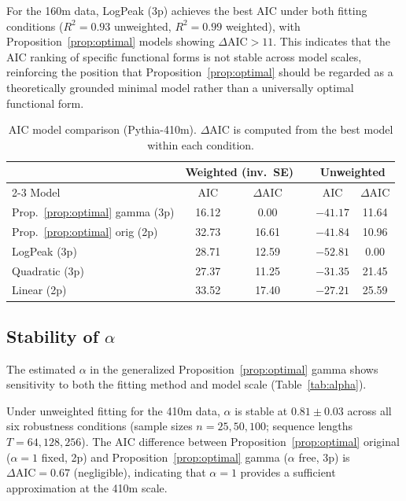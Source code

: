 \documentclass[11pt,a4paper]{article}
\begin{document}
For the 160m data, LogPeak (3p) achieves the best AIC under both fitting conditions
($R^2 = 0.93$ unweighted, $R^2 = 0.99$ weighted), with Proposition~\ref{prop:optimal} models showing
$\Delta\mathrm{AIC} > 11$. This indicates that the AIC ranking of specific functional forms
is not stable across model scales, reinforcing the position that Proposition~\ref{prop:optimal}
should be regarded as a theoretically grounded minimal model rather than a universally optimal
functional form.

\begin{table}[t]
\centering
\caption{AIC model comparison (Pythia-410m). $\Delta$AIC is computed from the best model
within each condition.}
\label{tab:aic}
\begin{tabular}{lccccc}
\toprule
& \multicolumn{2}{c}{Weighted (inv.\ SE)} & & \multicolumn{2}{c}{Unweighted} \\
\cmidrule{2-3}\cmidrule{5-6}
Model & AIC & $\Delta$AIC & & AIC & $\Delta$AIC \\
\midrule
Prop.~\ref{prop:optimal} gamma (3p) & 16.12 & 0.00  & & $-41.17$ & 11.64 \\
Prop.~\ref{prop:optimal} orig (2p)  & 32.73 & 16.61 & & $-41.84$ & 10.96 \\
LogPeak (3p)       & 28.71 & 12.59 & & $-52.81$ & 0.00  \\
Quadratic (3p)     & 27.37 & 11.25 & & $-31.35$ & 21.45 \\
Linear (2p)        & 33.52 & 17.40 & & $-27.21$ & 25.59 \\
\bottomrule
\end{tabular}
\end{table}

\subsection{Stability of $\alpha$}

The estimated $\alpha$ in the generalized Proposition~\ref{prop:optimal} gamma shows sensitivity to both the
fitting method and model scale (Table~\ref{tab:alpha}).

Under unweighted fitting for the 410m data, $\alpha$ is stable at $0.81 \pm 0.03$ across all
six robustness conditions (sample sizes $n = 25, 50, 100$; sequence lengths $T = 64, 128,
256$). The AIC difference between Proposition~\ref{prop:optimal} original ($\alpha = 1$ fixed, 2p) and
Proposition~\ref{prop:optimal} gamma ($\alpha$ free, 3p) is $\Delta\mathrm{AIC} = 0.67$ (negligible),
indicating that $\alpha = 1$ provides a sufficient approximation at the 410m scale.
\end{document}
